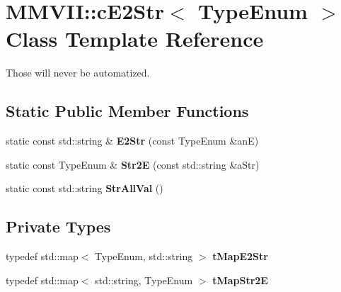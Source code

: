 \hypertarget{classMMVII_1_1cE2Str}{}\section{M\+M\+V\+II\+:\+:c\+E2\+Str$<$ Type\+Enum $>$ Class Template Reference}
\label{classMMVII_1_1cE2Str}


Those will never be automatized.  


\subsection*{Static Public Member Functions}
\begin{DoxyCompactItemize}
\item 
static const std\+::string \& {\bfseries E2\+Str} (const Type\+Enum \&anE)\hypertarget{classMMVII_1_1cE2Str_a00551c6be6ae056dd50110cad10bd49f}{}\label{classMMVII_1_1cE2Str_a00551c6be6ae056dd50110cad10bd49f}

\item 
static const Type\+Enum \& {\bfseries Str2E} (const std\+::string \&a\+Str)\hypertarget{classMMVII_1_1cE2Str_a9119b5b029f74b150a2c54398870d5cf}{}\label{classMMVII_1_1cE2Str_a9119b5b029f74b150a2c54398870d5cf}

\item 
static const std\+::string {\bfseries Str\+All\+Val} ()\hypertarget{classMMVII_1_1cE2Str_ad5b0116b2214e3c441b3e5682ca07ade}{}\label{classMMVII_1_1cE2Str_ad5b0116b2214e3c441b3e5682ca07ade}

\end{DoxyCompactItemize}
\subsection*{Private Types}
\begin{DoxyCompactItemize}
\item 
typedef std\+::map$<$ Type\+Enum, std\+::string $>$ {\bfseries t\+Map\+E2\+Str}\hypertarget{classMMVII_1_1cE2Str_a4ee1bac66bdfee6b289f39349a548a09}{}\label{classMMVII_1_1cE2Str_a4ee1bac66bdfee6b289f39349a548a09}

\item 
typedef std\+::map$<$ std\+::string, Type\+Enum $>$ {\bfseries t\+Map\+Str2E}\hypertarget{classMMVII_1_1cE2Str_a8c00709e6f5fa51946bfee80b4b40324}{}\label{classMMVII_1_1cE2Str_a8c00709e6f5fa51946bfee80b4b40324}

\end{DoxyCompactItemize}
